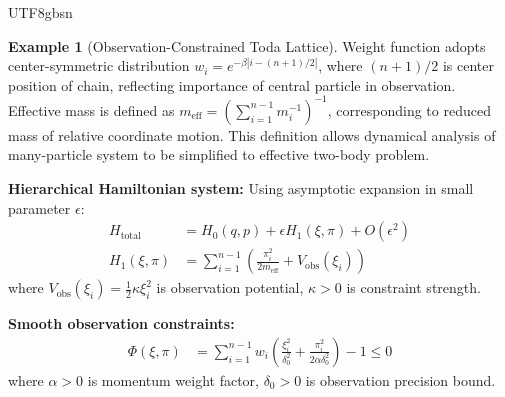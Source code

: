 \documentclass[a4paper,12pt]{extarticle}
\theoremstyle{definition}
\newtheorem{example}{Example}
\begin{document}
\begin{CJK}{UTF8}{gbsn}
\begin{example}[Observation-Constrained Toda Lattice]
Weight function adopts center-symmetric distribution $w_i = e^{-\beta|i - (n+1)/2|}$, where $(n+1)/2$ is center position of chain, reflecting importance of central particle in observation. Effective mass is defined as $m_{\text{eff}} = \left(\sum_{i=1}^{n-1} m_i^{-1}\right)^{-1}$, corresponding to reduced mass of relative coordinate motion. This definition allows dynamical analysis of many-particle system to be simplified to effective two-body problem.

\textbf{Hierarchical Hamiltonian system:}
Using asymptotic expansion in small parameter $\epsilon$:
\begin{align*}
H_{\text{total}} &= H_0(q,p) + \epsilon H_1(\xi,\pi) + O(\epsilon^2)\\
H_1(\xi,\pi) &= \sum_{i=1}^{n-1} \left( \frac{\pi_i^2}{2m_{\text{eff}}} + V_{\text{obs}}(\xi_i) \right)
\end{align*}
where $V_{\text{obs}}(\xi_i) = \frac{1}{2}\kappa \xi_i^2$ is observation potential, $\kappa > 0$ is constraint strength.

\textbf{Smooth observation constraints:}
\begin{align*}
\Phi(\xi,\pi) &= \sum_{i=1}^{n-1} w_i \left( \frac{\xi_i^2}{\delta_0^2} + \frac{\pi_i^2}{2\alpha \delta_0^2} \right) - 1 \leq 0
\end{align*}
where $\alpha > 0$ is momentum weight factor, $\delta_0 > 0$ is observation precision bound.


\end{example}
\end{CJK}
\end{document}
